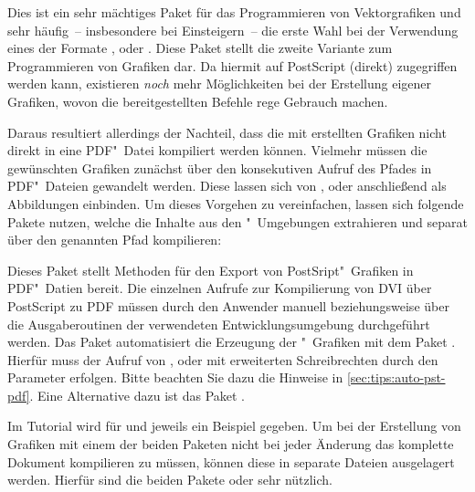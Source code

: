 \begin{DeclarePackages}
  Dies ist ein sehr mächtiges Paket für das Programmieren von Vektorgrafiken 
  und sehr häufig~-- insbesondere bei Einsteigern~-- die erste Wahl bei der 
  Verwendung eines der Formate ,  oder 
  .
  Diese Paket stellt die zweite Variante zum Programmieren von Grafiken dar. 
  Da hiermit auf PostScript (direkt) zugegriffen werden kann, existieren 
  \emph{noch} mehr Möglichkeiten bei der Erstellung eigener Grafiken, wovon
  die bereitgestellten Befehle rege Gebrauch machen.
  
  Daraus resultiert allerdings der Nachteil, dass die mit  
  erstellten Grafiken nicht direkt in eine PDF"~Datei kompiliert werden können. 
  Vielmehr müssen die gewünschten Grafiken zunächst über den konsekutiven 
  Aufruf des Pfades  in PDF"~Dateien gewandelt 
  werden. Diese lassen sich von ,  oder 
   anschließend als Abbildungen einbinden. Um dieses Vorgehen 
  zu vereinfachen, lassen sich folgende Pakete nutzen, welche die Inhalte aus 
  den "~Umgebungen extrahieren und separat über den 
  genannten Pfad kompilieren:
  \begin{DeclarePackages}
    Dieses Paket stellt Methoden für den Export von PostSript"~Grafiken in 
    PDF"~Datien bereit. Die einzelnen Aufrufe zur Kompilierung von DVI über 
    PostScript zu PDF müssen durch den Anwender manuell beziehungsweise über 
    die Ausgaberoutinen der verwendeten Entwicklungsumgebung durchgeführt 
    werden.
    Das Paket automatisiert die Erzeugung der "~Grafiken mit 
    dem Paket . Hierfür muss der Aufruf von , 
     oder  mit erweiterten Schreibrechten 
    durch den Parameter  erfolgen. Bitte beachten Sie 
    dazu die Hinweise in \autoref{sec:tips:auto-pst-pdf}. Eine Alternative dazu 
    ist das Paket .
  \end{DeclarePackages}
\end{DeclarePackages}
%
Im Tutorial  wird für  und  
jeweils ein Beispiel gegeben. Um bei der Erstellung von Grafiken mit einem der 
beiden Paketen nicht bei jeder Änderung das komplette Dokument kompilieren zu 
müssen, können diese in separate Dateien ausgelagert werden. Hierfür sind die 
beiden Pakete  oder  sehr nützlich.

